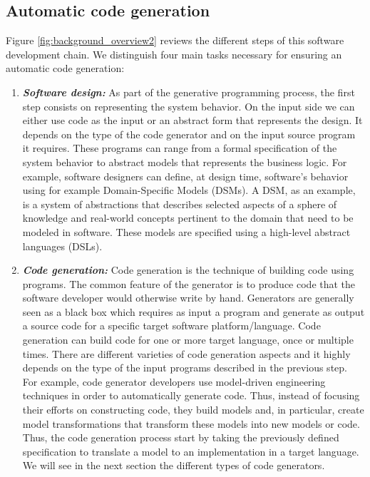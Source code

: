 \subsection{Automatic code generation}
Figure \ref{fig:background_overview2} reviews the different steps of this software development chain. We distinguish four main tasks necessary for ensuring an automatic code generation: 

 

\begin{enumerate}
\item \textbf{\textit{Software design:}} 
As part of the generative programming process, the first step consists on representing the system behavior. 
On the input side we can either use code as the input or an abstract form that represents the design. It depends on the type of the code generator and on the input source program it requires. These programs can range from a formal specification of the system behavior to abstract models that represents the business logic.
For example, software designers can define, at design time, software’s behavior using for example Domain-Specific Models (DSMs).
A DSM, as an example, is a system of abstractions that describes selected aspects of a sphere of knowledge and real-world concepts pertinent to the domain that need to be modeled in software. These models are specified using a high-level abstract languages (DSLs). %

\item \textbf{\textit{Code generation:}} 
Code generation is the technique of building code using programs. The common feature of the generator is to produce code that the software developer would otherwise write by hand.
Generators are generally seen as a black box which requires as input a program and generate as output a source code for a specific target software platform/language. %
Code generation can build code for one or more target language, once or multiple times. There are different varieties of code generation aspects and it highly depends on the type of the input programs described in the previous step. 
For example, code generator developers use model-driven engineering techniques in order to automatically generate code. Thus, instead of focusing their efforts on constructing code, they build models and, in particular, create model transformations that transform these models into new models or code. Thus, the code generation process start by taking the previously defined specification to translate a model to an implementation in a target language. We will see in the next section the different types of code generators.



\end{enumerate}
